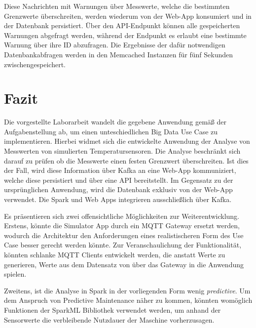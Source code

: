 Diese Nachrichten mit Warnungen über Messwerte, welche die bestimmten Grenzwerte überschreiten, werden wiederum von der Web-App konsumiert und in der Datenbank persistiert.
Über den API-Endpunkt  können alle gespeicherten Warnungen abgefragt werden, während der Endpunkt  es erlaubt eine bestimmte Warnung über ihre ID abzufragen.
Die Ergebnisse der dafür notwendigen Datenbankabfragen werden in den Memcached Instanzen für fünf Sekunden zwischengespeichert.

\section{Fazit}\label{sec:fazit}

Die vorgestellte Laborarbeit wandelt die gegebene Anwendung gemäß der Aufgabenstellung ab, um einen unteschiedlichen Big Data Use Case zu implementieren.
Hierbei widmet sich die entwickelte Anwendung der Analyse von Messwerten von simulierten Temperatursensoren.
Die Analyse beschränkt sich darauf zu prüfen ob die Messwerte einen festen Grenzwert überschreiten.
Ist dies der Fall, wird diese Information über Kafka an eine Web-App kommuniziert, welche diese persistiert und über eine API bereitstellt.
Im Gegensatz zu der ursprünglichen Anwendung, wird die Datenbank exklusiv von der Web-App verwendet.
Die Spark und Web Apps integrieren ausschließlich über Kafka.

Es präsentieren sich zwei offensichtliche Möglichkeiten zur Weiterentwicklung.
Erstens, könnte die Simulator App durch ein MQTT Gateway ersetzt werden, wodurch die Architektur den Anforderungen eines realistischeren Form des Use Case besser gerecht werden könnte.
Zur Veranschaulichung der Funktionalität, könnten schlanke MQTT Clients entwickelt werden, die anstatt Werte zu generieren, Werte aus dem Datensatz von \cite{helwig_condition_2015} über das Gateway in die Anwendung spielen.

Zweitens, ist die Analyse in Spark in der vorliegenden Form wenig \textit{predictive}.
Um dem Anspruch von Predictive Maintenance näher zu kommen, könnten womöglich Funktionen der SparkML Bibliothek verwendet werden, um anhand der Sensorwerte die verbleibende Nutzdauer der Maschine vorherzusagen.
